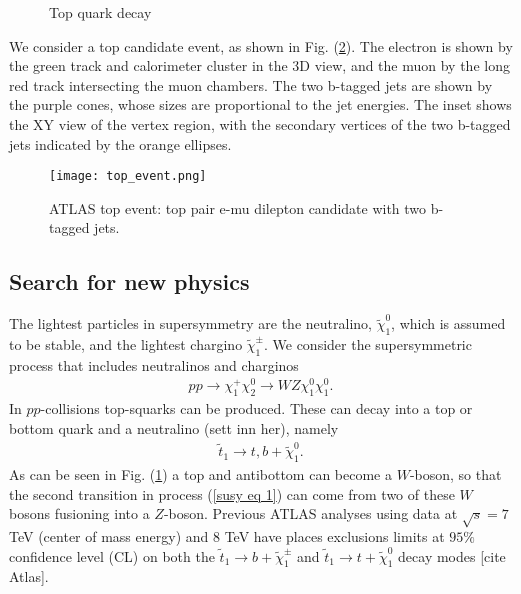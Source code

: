 \documentclass[11pt]{article}
\begin{document}
\begin{multicols}{2}
\begin{flushleft}
\begin{figure}[H]
\centering
{}
\caption{Top quark decay}
\label{fig::top quark decay}
\end{figure}
We consider a top candidate event, as shown in Fig. (\ref{fig:: top event ATLAS}). The electron is shown by the green track and calorimeter cluster in the 3D view, and the muon by the long red track intersecting the muon chambers. The two b-tagged jets are shown by the purple cones, whose sizes are proportional to the jet energies. The inset shows the XY view of the vertex region, with the secondary vertices of the two b-tagged jets indicated by the orange ellipses.
\begin{figure}[H]
\centering
\texttt{[image: top\_event.png]}
\caption{ATLAS top event: top pair e-mu dilepton candidate with two b-tagged jets.}
\label{fig:: top event ATLAS}
\end{figure}
\end{flushleft}



\subsection*{Search for new physics}
\begin{flushleft}
The lightest particles in supersymmetry are the neutralino, $\tilde{\chi}_1^0$, which is assumed to be stable, and the lightest chargino $\tilde{\chi}_1^{\pm}$. We consider the supersymmetric process that includes neutralinos and charginos
\begin{align}\label{susy eq 1}
pp \rightarrow \chi^+_1 \chi^0_2 \rightarrow WZ \chi_1^0 \chi_1^0.
\end{align}
In $pp$-collisions top-squarks can be produced. These can decay into a top or bottom quark and a neutralino (sett inn her), namely
\begin{align*}
\tilde{t}_1 \rightarrow t,b + \tilde{\chi}_1^0.
\end{align*}
As can be seen in Fig. (\ref{fig::top quark decay}) a top and antibottom can become a $W$-boson, so that the second transition in process (\ref{susy eq 1}) can come from two of these $W$ bosons fusioning into a $Z$-boson. Previous ATLAS analyses using data at $\sqrt{s}=7$ TeV (center of mass energy) and 8 TeV have places exclusions limits at $95\%$ confidence level (CL) on both the $\tilde{t}_1 \rightarrow b + \tilde{\chi}_1^{\pm}$ and $\tilde{t}_1 \rightarrow t+ \tilde{\chi}_1^0$ decay modes [cite Atlas].
\end{flushleft}


\end{multicols}
\end{document}
